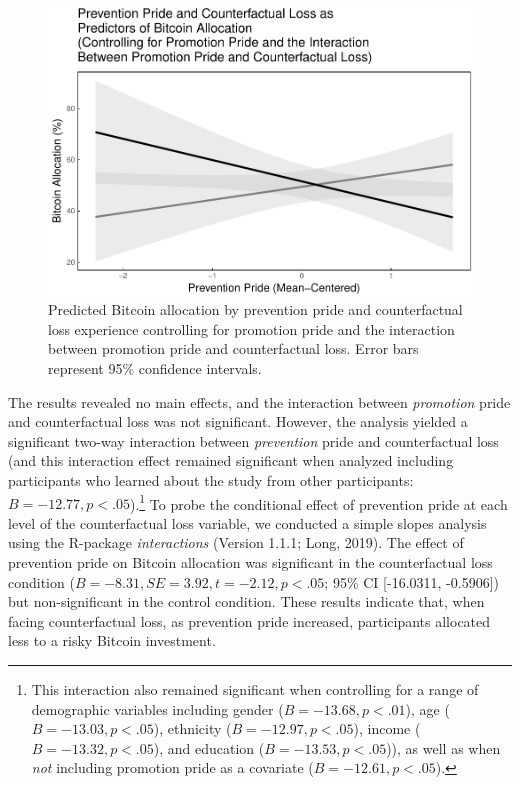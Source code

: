 \documentclass[man,floatsintext]{apa6}
\let\rmarkdownfootnote\footnote%
\def\footnote{\protect\rmarkdownfootnote}
\begin{document}
\begin{figure}

{\centering \includegraphics[width=0.9\linewidth,height=0.9\textheight]{rfcfloss_manuscript_files/figure-latex/primarymodelplot-1} 

}

\caption{Predicted Bitcoin allocation by prevention pride and counterfactual loss experience controlling for promotion pride and the interaction between promotion pride and counterfactual loss. Error bars represent 95\% confidence intervals.}\label{fig:primarymodelplot}
\end{figure}

The results revealed no main effects, and the interaction between \emph{promotion} pride and counterfactual loss was not significant. However, the analysis yielded a significant two-way interaction between \emph{prevention} pride and counterfactual loss (and this interaction effect remained significant when analyzed including participants who learned about the study from other participants: \(B = -12.77, p < .05\)).\footnote{This interaction also remained significant when controlling for a range of demographic variables including gender (\(B = -13.68, p < .01\)), age (\(B = -13.03, p < .05\)), ethnicity (\(B = -12.97, p < .05\)), income (\(B = -13.32, p < .05\)), and education (\(B = -13.53, p < .05\))), as well as when \emph{not} including promotion pride as a covariate (\(B = -12.61, p < .05\)).} To probe the conditional effect of prevention pride at each level of the counterfactual loss variable, we conducted a simple slopes analysis using the R-package \emph{interactions} (Version 1.1.1; Long, 2019). The effect of prevention pride on Bitcoin allocation was significant in the counterfactual loss condition (\(B = -8.31, SE = 3.92, t = -2.12, p < .05\); 95\% CI {[}-16.0311, -0.5906{]}) but non-significant in the control condition. These results indicate that, when facing counterfactual loss, as prevention pride increased, participants allocated less to a risky Bitcoin investment.
\end{document}
